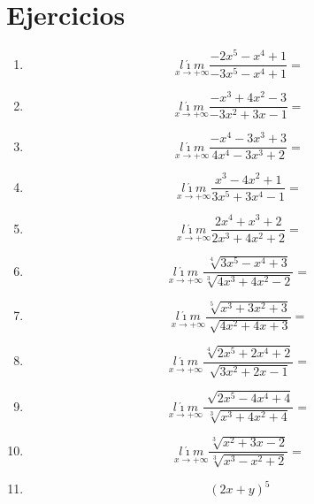 \documentclass[oneside,spanish,letter]{article}
\begin{document}
\section{Ejercicios}
\begin{enumerate}
 \item $$\underset{x\rightarrow +\infty}{l\acute{\imath}m} \frac{-2x^5-x^4+1}{-3x^5-x^4+1}=$$
 \item $$\underset{x\rightarrow +\infty}{l\acute{\imath}m} \frac{-x^3+4x^2-3}{-3x^2+3x-1}=$$
 \item $$\underset{x\rightarrow +\infty}{l\acute{\imath}m} \frac{-x^4-3x^3+3}{4x^4-3x^3+2}=$$
 \item $$\underset{x\rightarrow +\infty}{l\acute{\imath}m} \frac{x^3-4x^2+1}{3x^5+3x^4-1}=$$
 \item $$\underset{x\rightarrow +\infty}{l\acute{\imath}m} \frac{2x^4+x^3+2}{2x^3+4x^2+2}=$$
 \item $$\underset{x\rightarrow +\infty}{l\acute{\imath}m} \frac{\sqrt[4]{3x^5-x^4+3}}{\sqrt[3]{4x^3+4x^2-2}}=$$
 \item $$\underset{x\rightarrow +\infty}{l\acute{\imath}m} \frac{\sqrt[5]{x^3+3x^2+3}}{\sqrt[]{4x^2+4x+3}}=$$
 \item $$\underset{x\rightarrow +\infty}{l\acute{\imath}m} \frac{\sqrt[4]{2x^5+2x^4+2}}{\sqrt[]{3x^2+2x-1}}=$$
 \item $$\underset{x\rightarrow +\infty}{l\acute{\imath}m} \frac{\sqrt[]{2x^5-4x^4+4}}{\sqrt[3]{x^3+4x^2+4}}=$$
 \item $$\underset{x\rightarrow +\infty}{l\acute{\imath}m} \frac{\sqrt[3]{x^2+3x-2}}{\sqrt[3]{x^3-x^2+2}}=$$
\item $$(2x+y)^5$$
 \end{enumerate}
  \newpage
\end{document}
